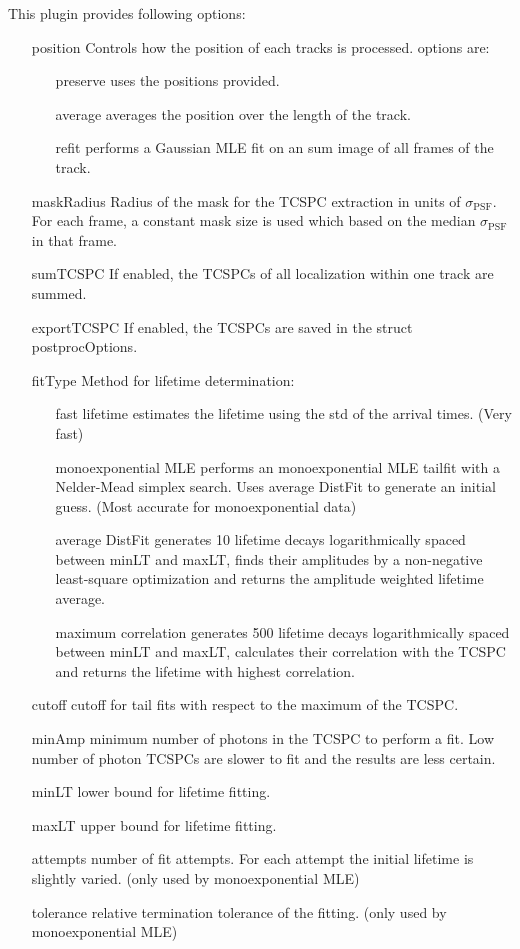 \documentclass[11pt,onside]{report}
\numberwithin{equation}{chapter}
\begin{document}
This plugin provides following options:
\begin{itemize}[leftmargin=3cm]
	\item[\textsf{position}] Controls how the position of each tracks is processed. options are:
	\begin{itemize}[leftmargin=2cm]
		\item[\textsf{preserve}] uses the positions provided.
		\item[\textsf{average}] averages the position over the length of the track.
		\item[\textsf{refit}] performs a Gaussian MLE fit on an sum image of all frames of the track.
	\end{itemize}
	\item[\textsf{maskRadius}] Radius of the mask for the TCSPC extraction in units of $\sigma_\mathrm{PSF}$. For each frame, a constant mask size is used which based on the median $\sigma_\mathrm{PSF}$ in that frame.
	\item[\textsf{sumTCSPC}] If enabled, the TCSPCs of all localization within one track are summed.
	\item[\textsf{exportTCSPC}] If enabled, the TCSPCs are saved in the struct postprocOptions.
	\item[\textsf{fitType}] Method for lifetime determination:
	\begin{itemize}[leftmargin=2cm]
		\item[\textsf{fast lifetime}] estimates the lifetime using the std of the arrival times. (Very fast)
		\item[\textsf{monoexponential MLE}] performs an monoexponential MLE tailfit with a Nelder-Mead simplex search.  Uses \textsf{average DistFit} to generate an initial guess. (Most accurate for monoexponential data)
		\item[\textsf{average DistFit}] generates 10 lifetime decays logarithmically spaced between \textsf{minLT} and \textsf{maxLT}, finds their amplitudes by a non-negative least-square optimization and returns the amplitude weighted lifetime average.
		\item[\textsf{maximum correlation}] generates 500 lifetime decays logarithmically spaced between \textsf{minLT} and \textsf{maxLT}, calculates their correlation with the TCSPC and returns the lifetime with highest correlation.
	\end{itemize}
\item[\textsf{cutoff}] cutoff for tail fits with respect to the maximum of the TCSPC.
\item[\textsf{minAmp}] minimum number of photons in the TCSPC to perform a fit. Low number of photon TCSPCs are slower to fit and the results are less certain.
\item[\textsf{minLT}] lower bound for lifetime fitting.
\item[\textsf{maxLT}] upper bound for lifetime fitting.
\item[\textsf{attempts}] number of fit attempts. For each attempt the initial lifetime is slightly varied. (only used by \textsf{monoexponential MLE})
\item[\textsf{tolerance}]relative termination tolerance of the fitting. (only used by \textsf{monoexponential MLE})
\end{itemize}
\end{document}

